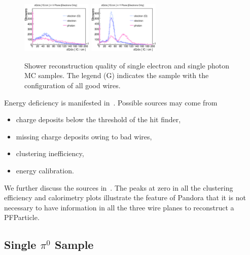 \begin{figure}[htbp]
\begin{center}
\includegraphics[width=0.3\textwidth]{figs/mc/single_em/dQdxV.eps}
\includegraphics[width=0.3\textwidth]{figs/mc/single_em/dQdxY.eps}
\caption{Shower reconstruction quality of single electron and single
photon MC samples.  The legend (G) indicates the sample with the configuration
of all good wires.}
\label{fig:shr_quality_single_em}
\end{center}
\end{figure}


Energy deficiency is manifested in~.
Possible sources may come from
\begin{itemize}
\item charge deposits below the threshold of the hit finder,
\item missing charge deposits owing to bad wires,
\item clustering inefficiency,
\item energy calibration.
\end{itemize}
We further discuss the sources in~. 
The peaks at zero in all the clustering efficiency and calorimetry
plots illustrate the feature of Pandora that it is not necessary to
have information in all the three wire planes to reconstruct a 
PFParticle.


\clearpage
\subsection{Single $\pi^0$ Sample}
\label{sec:single_pi0}

